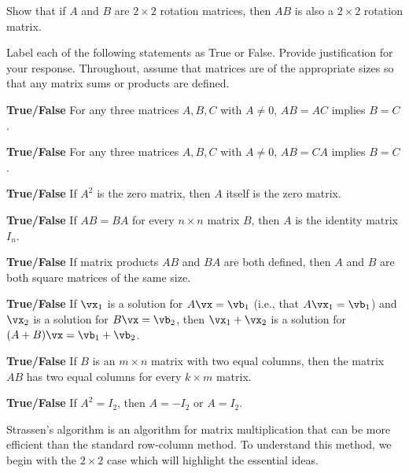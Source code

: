 	\ea

\item Show that if $A$ and $B$ are $2\times 2$ rotation matrices, then $AB$ is also a $2\times 2$ rotation matrix. 
	
\item Label each of the following statements as True or False. Provide justification for your response. Throughout, assume that matrices are of the appropriate sizes so that any matrix sums or products are defined. 
\ba
\item \textbf{True/False} For any three matrices $A, B, C$ with $A \neq 0$, $AB=AC$ implies $B=C$.

\item \textbf{True/False} For any three matrices $A, B, C$ with $A \neq 0$, $AB=CA$ implies $B=C$.

\item \textbf{True/False} If $A^2$ is the zero matrix, then $A$ itself is the zero matrix.

\item \textbf{True/False} If $AB=BA$ for every $n \times n$ matrix $B$, then $A$ is the identity matrix $I_n$.

\item \textbf{True/False} If matrix products $AB$ and $BA$ are both defined, then $A$ and $B$ are both square matrices of the same size.

\item \textbf{True/False} If $\vx_1$ is a solution for $A\vx=\vb_1$ (i.e., that $A\vx_1 = \vb_1$) and $\vx_2$ is a solution for $B\vx=\vb_2$, then $\vx_1+\vx_2$ is a solution for $(A+B)\vx=\vb_1+\vb_2$.

\item \textbf{True/False} If $B$ is an $m\times n$ matrix with two equal columns, then the matrix $AB$ has two equal columns for every $k \times m$ matrix.

\item \textbf{True/False} If $A^2 = I_2$, then $A=-I_2$ or $A=I_2$.



\ea
\ee

\label{sec:proj_starassen}

Strassen's algorithm is an algorithm for matrix multiplication that can be more efficient than the standard row-column method. To understand this method, we begin with the $2 \times 2$ case which will highlight the essential ideas.  

